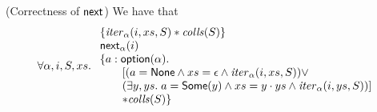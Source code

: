 \begin{lemma}{(Correctness of $\mathsf{next}$)}
We have that 
\begin{displaymath}
  \forall \alpha, i, S, xs.\; 
  \begin{array}{l}
    \{{\mathit{iter}_\alpha(i, xs, S) * \mathit{colls}(S)}\} \\
    \mathsf{next}_\alpha(i) \\
    \{a:\mathsf{option }{(\alpha)}.\; \\
      \qquad [(a = \mathsf{None} \land xs = \epsilon \land \mathit{iter}_\alpha(i, xs, S)) \vee \\
      \qquad (\exists y, ys.\; a = \mathsf{Some}(y) \land xs = y\cdot ys \land \mathit{iter}_\alpha(i, ys, S))]
       \\
      \qquad * \mathit{colls}(S)\} \\
  \end{array}
\end{displaymath}
\end{lemma}

